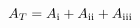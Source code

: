 \documentclass{standalone}
\newcommand{\RN}[1]{%
  \textup{\uppercase\expandafter{\romannumeral#1}}%
}
\begin{document}
    $A_T = A_\RN{1} + A_\RN{2} + A_\RN{3}$
\end{document}
